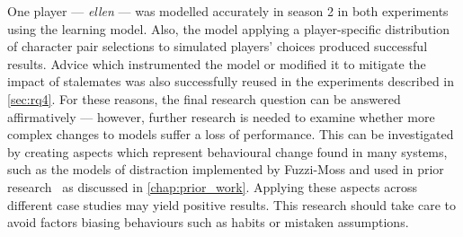 One player --- \emph{ellen} --- was modelled accurately in season 2 in both
experiments using the learning model. Also, the model applying a player-specific
distribution of character pair selections to simulated players' choices produced
successful results. Advice which instrumented the model or modified it to
mitigate the impact of stalemates was also successfully reused in the
experiments described in \cref{sec:rq4}. For these reasons, the final research
question can be answered affirmatively --- however, further research is needed
to examine whether more complex changes to models suffer a loss of performance.
This can be investigated by creating
aspects which represent behavioural change found in many systems, such as the
models of distraction implemented by Fuzzi-Moss\cite{fuzzimoss_repo} and used in
prior research~\cite{wallis2018caise} as discussed in \cref{chap:prior_work}.
Applying these aspects across different case studies may yield positive results.
This research should take care to avoid factors biasing behaviours such as
habits or mistaken assumptions.
